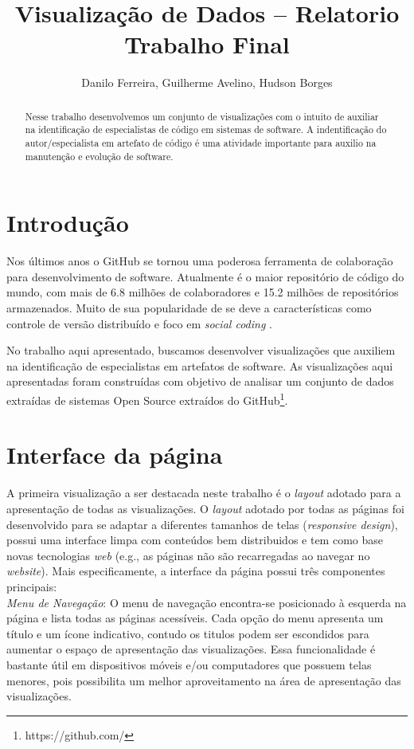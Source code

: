 \documentclass[12pt]{article}
\title{Visualização de Dados -- Relatorio Trabalho Final}
\author{Danilo Ferreira, Guilherme Avelino, Hudson Borges}
\begin{document}
\maketitle

\begin{abstract}
Nesse trabalho desenvolvemos um conjunto de visualizações com o intuito de auxiliar na identificação de especialistas de código em sistemas de software. A indentificação do autor/especialista em artefato de código é uma atividade importante   para auxilio na manutenção e evolução de software.\\
\end{abstract}


\section{Introdução}

Nos últimos anos o GitHub se tornou uma poderosa ferramenta de colaboração para desenvolvimento de software. Atualmente é o maior repositório de código do mundo, com mais de 6.8 milhões de colaboradores e 15.2 milhões de repositórios armazenados. Muito de sua popularidade de se deve a características como controle de versão distribuído e foco em \textit{social coding} \cite{Dabbish2012}. 

No trabalho aqui apresentado, buscamos desenvolver visualizações que auxiliem na identificação de especialistas em artefatos de software. As visualizações aqui apresentadas foram construídas com objetivo de analisar um conjunto de dados extraídas de sistemas Open Source extraídos do GitHub\footnote{https://github.com/}.

\section{Interface da página}

A primeira visualização a ser destacada neste trabalho é o \textit{layout} adotado para a apresentação de todas as visualizações. O \textit{layout} adotado por todas as páginas foi desenvolvido para se adaptar a diferentes tamanhos de telas (\textit{responsive design}), possui uma interface limpa com conteúdos bem distribuidos e tem como base novas tecnologias \textit{web} (e.g., as páginas não são recarregadas ao navegar no \textit{website}). Mais especificamente, a interface da página possui três componentes principais: \\


\noindent \emph{Menu de Navegação}: O menu de navegação encontra-se posicionado à esquerda na página e lista todas as páginas acessíveis. Cada opção do menu apresenta um título e um ícone indicativo, contudo os titulos podem ser escondidos para aumentar o espaço de apresentação das visualizações. Essa funcionalidade é bastante útil em dispositivos móveis e/ou computadores que possuem telas menores, pois possibilita um melhor aproveitamento na área de apresentação das visualizações. \\
\end{document}
